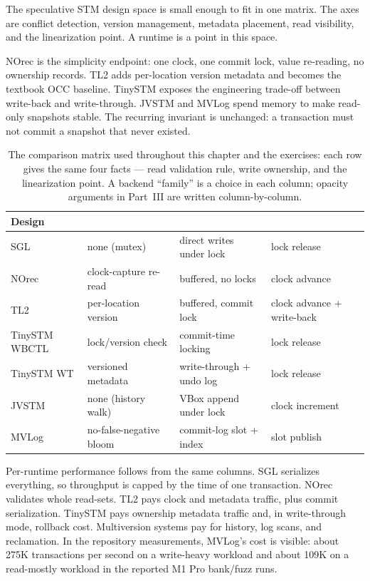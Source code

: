 The speculative STM design space is small enough to fit in one matrix. The axes are conflict detection, version management, metadata placement, read visibility, and the linearization point. A runtime is a point in this space.

NOrec is the simplicity endpoint: one clock, one commit lock, value re-reading, no ownership records. TL2 adds per-location version metadata and becomes the textbook OCC baseline. TinySTM exposes the engineering trade-off between write-back and write-through. JVSTM and MVLog spend memory to make read-only snapshots stable. The recurring invariant is unchanged: a transaction must not commit a snapshot that never existed.

\begin{table}[ht]
\centering
\small
\begin{tabular}{lM{3.1cm}M{3.4cm}M{3.4cm}}
\hline
\textbf{Design} &  &  &  \\
\hline
SGL & none (mutex)           & direct writes under lock      & lock release \\
NOrec & clock-capture re-read & buffered, no locks            & clock advance \\
TL2 & per-location version   & buffered, commit lock         & clock advance + write-back \\
TinySTM WBCTL & lock/version check & commit-time locking           & lock release \\
TinySTM WT & versioned metadata   & write-through + undo log       & lock release \\
JVSTM & none (history walk)   & VBox append under lock        & clock increment \\
MVLog & no-false-negative bloom & commit-log slot + index      & slot publish \\
\hline
\end{tabular}
\caption{The comparison matrix used throughout this chapter and the exercises: each row gives the same four facts --- read validation rule, write ownership, and the linearization point. A backend ``family'' is a choice in each column; opacity arguments in Part~III are written column-by-column.}
\label{tab:family-matrix}
\end{table}

Per-runtime performance follows from the same columns. SGL serializes everything, so throughput is capped by the time of one transaction. NOrec validates whole read-sets. TL2 pays clock and metadata traffic, plus commit serialization. TinySTM pays ownership metadata traffic and, in write-through mode, rollback cost. Multiversion systems pay for history, log scans, and reclamation. In the repository measurements, MVLog's cost is visible: about 275K transactions per second on a write-heavy workload and about 109K on a read-mostly workload in the reported M1 Pro bank/fuzz runs.

